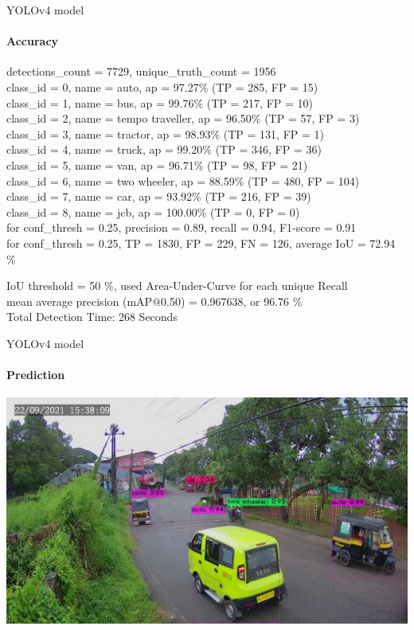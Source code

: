 \documentclass{beamer}
\begin{document}
	\begin{frame}{YOLOv4 model}
		\framesubtitle{Accuracy}
		\begin{scriptsize}
			detections\_count = 7729, unique\_truth\_count = 1956  \\ 
			class\_id = 0, name = auto, ap = 97.27\%   	 (TP = 285, FP = 15) \\
			class\_id = 1, name = bus, ap = 99.76\%   	 (TP = 217, FP = 10) \\
			class\_id = 2, name = tempo traveller, ap = 96.50\%   	 (TP = 57, FP = 3) \\
			class\_id = 3, name = tractor, ap = 98.93\%   	 (TP = 131, FP = 1) \\
			class\_id = 4, name = truck, ap = 99.20\%   	 (TP = 346, FP = 36) \\
			class\_id = 5, name = van, ap = 96.71\%   	 (TP = 98, FP = 21) \\
			class\_id = 6, name = two wheeler, ap = 88.59\%   	 (TP = 480, FP = 104) \\
			class\_id = 7, name = car, ap = 93.92\%   	 (TP = 216, FP = 39) \\
			class\_id = 8, name = jcb, ap = 100.00\%   	 (TP = 0, FP = 0) \\
			
			for conf\_thresh = 0.25, precision = 0.89, recall = 0.94, F1-score = 0.91  \\
			for conf\_thresh = 0.25, TP = 1830, FP = 229, FN = 126, average IoU = 72.94 \%  \
			
			IoU threshold = 50 \%, used Area-Under-Curve for each unique Recall  \\
			mean average precision (mAP@0.50) = 0.967638, or 96.76 \% \\
			Total Detection Time: 268 Seconds
		\end{scriptsize}		
	\end{frame}

	\begin{frame}{YOLOv4 model}
		\framesubtitle{Prediction}
		\begin{center}
			\includegraphics[width=\linewidth]{res/data_set1/predictions}
		\end{center}
	\end{frame}
\end{document}
